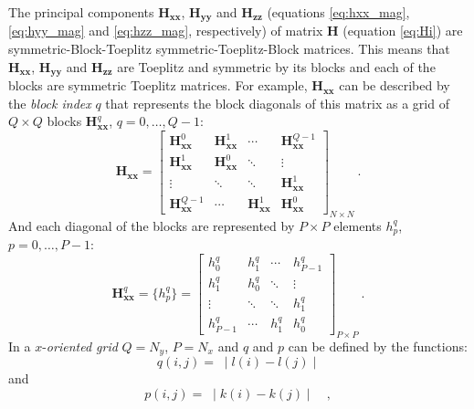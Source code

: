 The principal components $\mathbf{H_{xx}}$, $\mathbf{H_{yy}}$ and $\mathbf{H_{zz}}$ (equations \ref{eq:hxx_mag}, \ref{eq:hyy_mag} and \ref{eq:hzz_mag}, respectively) of matrix $\mathbf{H}$ (equation \ref{eq:Hi}) are symmetric-Block-Toeplitz symmetric-Toeplitz-Block matrices. This means that $\mathbf{H_{xx}}$, $\mathbf{H_{yy}}$ and $\mathbf{H_{zz}}$ are Toeplitz and symmetric by its blocks and each of the blocks are symmetric Toeplitz matrices. 
For example, $\mathbf{H_{xx}}$ can be described by the \textit{block index} $q$ that represents the block diagonals of this matrix as a grid of $Q \times Q$ blocks $\mathbf{H}^{q}_\mathbf{xx}$, $q = 0, \dots, Q - 1$:
\begin{equation}
\mathbf{H_{xx}} = \begin{bmatrix}
\mathbf{H}^{0}_\mathbf{xx}  & \mathbf{H}^{1}_\mathbf{xx} & \cdots         & \mathbf{H}^{Q-1}_\mathbf{xx} \\
\mathbf{H}^{1}_\mathbf{xx}  & \mathbf{H}^{0}_\mathbf{xx} & \ddots         & \vdots           \\ 
\vdots           & \ddots         & \ddots         & \mathbf{H}^{1}_\mathbf{xx}   \\
\mathbf{H}^{Q-1}_\mathbf{xx} & \cdots         & \mathbf{H}^{1}_\mathbf{xx} & \mathbf{H}^{0}_\mathbf{xx}                
\end{bmatrix}_{N \times N} \: .
\label{eq:BTTB_Hxx}
\end{equation}
And each diagonal of the blocks are represented by $P \times P$ elements $h^{q}_{p}$, $p = 0, \dots, P - 1$:
\begin{equation}
\mathbf{H}^{q}_\mathbf{xx} = \{h^{q}_p\} = \begin{bmatrix}
h^{q}_{0}   & h^{q}_{1} & \cdots    & h^{q}_{P-1} \\
h^{q}_{1}   & h^{q}_{0} & \ddots    & \vdots           \\ 
\vdots      & \ddots    & \ddots    & h^{q}_{1}   \\
h^{q}_{P-1} & \cdots    & h^{q}_{1} & h^{q}_{0}                 
\end{bmatrix}_{P \times P} \: .
\label{eq:Hxx_block}
\end{equation}
In a $x$-\textit{oriented grid} $Q = N_{y}$, $P = N_{x}$ and $q$ and $p$ can be defined by the functions:
\begin{equation}
q(i, j) = \; \mid l(i) - l(j) \mid
\label{eq:Hxx-q-x-oriented}
\end{equation}
and
\begin{equation}
p(i, j) = \; \mid k(i) - k(j) \mid \quad ,
\label{eq:Hxx-p-x-oriented}
\end{equation}
